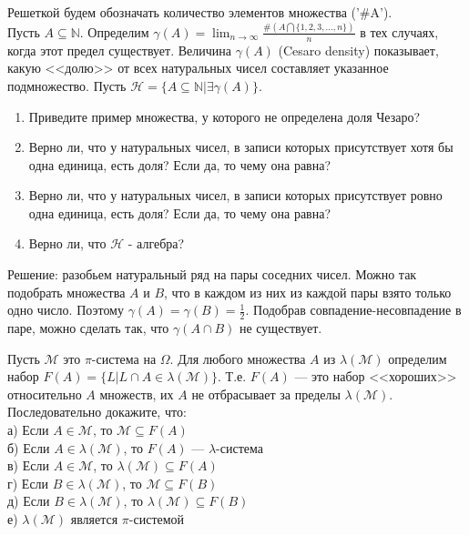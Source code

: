 \begin{problem}
Решеткой будем обозначать количество элементов множества ('\#A').\\
Пусть $A \subseteq \mathbb{N}$. Определим
$\gamma(A)=\lim_{n\rightarrow \infty}\frac{\#(A\bigcap
\{1,2,3,\ldots,n\})}{n}$ в тех случаях, когда этот предел существует.
Величина $\gamma(A)$ (Cesaro density) показывает, какую <<долю>> от
всех натуральных чисел составляет указанное подмножество. Пусть
$\mathcal{H}=\{A\subseteq \mathbb{N}|\exists \gamma(A)\}$.

\begin{enumerate}
\item Приведите пример множества, у которого не определена доля Чезаро?
\item Верно ли, что у натуральных чисел, в записи которых присутствует
хотя бы одна единица, есть доля? Если да, то чему она равна?
\item Верно ли, что у натуральных чисел, в записи которых присутствует
ровно одна единица, есть доля? Если да, то чему она равна?
\item Верно
ли, что $\mathcal{H}$ -
алгебра?
\end{enumerate}


\begin{sol}

Решение: разобьем натуральный ряд на пары соседних чисел. Можно
так подобрать множества $A$ и $B$, что в каждом из них из каждой
пары взято только одно число. Поэтому
$\gamma(A)=\gamma(B)=\frac{1}{2}$. Подобрав
совпадение-несовпадение в паре, можно сделать так, что
$\gamma(A\cap B)$ не существует.
\end{sol}
\end{problem}

\begin{problem}
Пусть $\mathcal{M}$ это $\pi$-система на $\Omega$. Для любого
множества $A$ из $\lambda(\mathcal{M})$ определим набор
$F(A)=\{L|L\cap A \in \lambda(\mathcal{M})\}$. Т.е. $F(A)$ — это
набор <<хороших>> относительно $A$ множеств, их $A$ не отбрасывает
за пределы $\lambda(\mathcal{M})$. \\
Последовательно докажите, что: \\
а) Если $A \in \mathcal{M}$, то $\mathcal{M}\subseteq F(A)$ \\
б) Если $A\in\lambda(\mathcal{M})$, то $F(A)$ — $\lambda$-система \\
в) Если $A \in \mathcal{M}$, то $\lambda(\mathcal{M})\subseteq
F(A)$ \\
г) Если $B\in \lambda(\mathcal{M})$, то $\mathcal{M}\subseteq
F(B)$ \\
д) Если $B\in \lambda(\mathcal{M})$, то
$\lambda(\mathcal{M})\subseteq
F(B)$ \\
е) $\lambda(\mathcal{M})$ является $\pi$-системой

\begin{sol}

\end{sol}
\end{problem}

